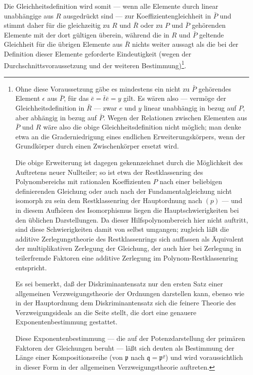 \documentclass[12pt,a4paper]{article}
\theoremstyle{plain}
\theoremstyle{definition}
\theoremstyle{remark}
\begin{document}
Die Gleichheitsdefinition wird somit --- wenn alle Elemente durch linear unabhängige aus $R$ ausgedrückt sind --- zur Koeffizientengleichheit in $\bar{P}$ und stimmt daher für die gleichzeitig zu $R$ und $\bar{R}$ oder zu $P$ und $\bar{P}$ gehörenden Elemente mit der dort gültigen überein, während die in $R$ und $\bar{P}$ geltende Gleichheit für die übrigen Elemente aus $\bar{R}$ nichts weiter aussagt als die bei der Definition dieser Elemente geforderte Eindeutigkeit (wegen der Durchschnittsvoraussetzung und der weiteren Bestimmung)\footnote{Ohne diese Voraussetzung gäbe es mindestens ein nicht zu $\bar{P}$ gehörendes Element $\epsilon$ aus $\bar{P}$, für das $\bar{e} = \bar{t}\bar{e} = y$ gilt. Es wären also --- vermöge der Gleichheitsdefinition in $\bar{R}$ --- zwar $e$ und $y$ linear unabhängig in bezug auf $P$, aber abhängig in bezug auf $\bar{P}$. Wegen der Relationen zwischen Elementen aus $\bar{P}$ und $R$ wäre also die obige Gleichheitsdefinition nicht möglich; man denke etwa an die Graderniedrigung eines endlichen Erweiterungskörpers, wenn der Grundkörper durch einen Zwischenkörper ersetzt wird.

Die obige Erweiterung ist dagegen gekennzeichnet durch die Möglichkeit des Auftretens neuer Nullteiler; so ist etwa der Restklassenring des Polynombereichs mit rationalen Koeffizienten $P$ nach einer beliebigen definierenden Gleichung oder auch nach der Fundamentalgleichung nicht isomorph zu sein dem Restklassenring der Hauptordnung nach $(p)$ --- und in diesem Aufhören des Isomorphismus liegen die Hauptschwierigkeiten bei den üblichen Darstellungen. Da dieser Hilfspolynombereich hier nicht auftritt, sind diese Schwierigkeiten damit von selbst umgangen; zugleich läßt die additive Zerlegungstheorie des Restklassenrings sich auffassen als Äquivalent der multiplikativen Zerlegung der Gleichung, der auch hier bei Zerlegung in teilerfremde Faktoren eine additive Zerlegung im Polynom-Restklassenring entspricht.

Es sei bemerkt, daß der Diskriminantensatz nur den ersten Satz einer allgemeinen Verzweigungstheorie der Ordnungen darstellen kann, ebenso wie in der Hauptordnung dem Diskriminantensatz sich die feinere Theorie des Verzweigungsideals an die Seite stellt, die dort eine genauere Exponentenbestimmung gestattet.

Diese Exponentenbestimmung --- die auf der Potenzdarstellung der primären Faktoren der Gleichungen beruht --- läßt sich deuten als Bestimmung der Länge einer Kompositionsreihe (von $\mathfrak{p}$ nach $\mathfrak{q} = \mathfrak{p}^{\varrho}$) und wird voraussichtlich in dieser Form in der allgemeinen Verzweigungstheorie auftreten.}.
\end{document}
